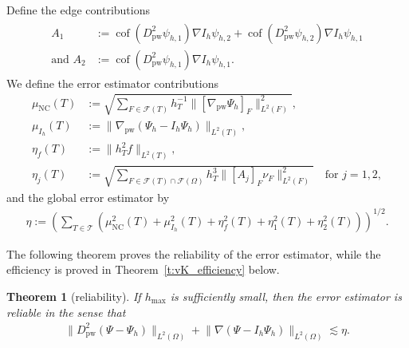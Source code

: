 \documentclass[a4paper]{amsart}
\newtheorem{theorem}{Theorem}
\theoremstyle{definition}
\numberwithin{equation}{section}
\numberwithin{theorem}{section}
\newcommand{\pw}{\mathrm{pw}}
\newcommand{\nc}{\mathrm{NC}}
\newcommand{\tri}{\mathcal{T}}
\newcommand{\cof}{\operatorname{cof}}
\begin{document}
Define the edge contributions
\begin{align}\label{e:A1A2}
 \begin{aligned}
A_1 &:= \cof(D_\pw^2 \psi_{h,1})\nabla I_h\psi_{h,2}
              + \cof(D_\pw^2 \psi_{h,2})\nabla I_h\psi_{h,1}
\\
\text{and }
A_2&:=\cof(D_\pw^2 \psi_{h,1})\nabla I_h\psi_{h,1}
.
\end{aligned}
\end{align}
We define the error estimator contributions
\begin{align*}
    \mu_\nc(T) &:= \sqrt{\sum_{F\in\mathcal{F}(T)} h_T^{-1}
            \lVert [\nabla_\pw \Psi_h]_F\rVert_{L^2(F)}^2},\\
    \mu_{I_h}(T) &:= \lVert \nabla_\pw (\Psi_h-I_h\Psi_h)\rVert_{L^2(T)},\\
    \eta_f(T) &:= \lVert h_T^2 f\rVert_{L^2(T)},
    \\
    \eta_j(T) &:= \sqrt{\sum_{F\in\mathcal{F}(T)\cap\mathcal{F}(\Omega)}
            h_T^{3} \lVert [A_j]_F\nu_F\rVert_{L^2(F)}^2}
            \quad\text{for }j=1,2 ,
\end{align*}
and the global error estimator by 
\begin{align*}
    \eta:=\left(\sum_{T\in\tri}\left(\mu_\nc^2(T)+\mu_{I_h}^2(T) 
      +\eta_f^2(T) + \eta_1^2(T) + \eta_2^2(T)\right)\right)^{1/2}.
\end{align*}

The following theorem proves the reliability of the error 
estimator, while the efficiency is proved in 
Theorem~\ref{t:vK_efficiency} below.

\begin{theorem}[reliability]\label{t:vK_reliability}
    If $h_\mathrm{max}$ is sufficiently small, then the error estimator is 
    reliable in the sense that
    \begin{align*}
        \lVert D_\pw^2 (\Psi-\Psi_h)\rVert_{L^2(\Omega)}
        + \lVert \nabla (\Psi-I_h\Psi_h)\rVert_{L^2(\Omega)}
        \lesssim \eta.
    \end{align*}
\end{theorem}
\end{document}
